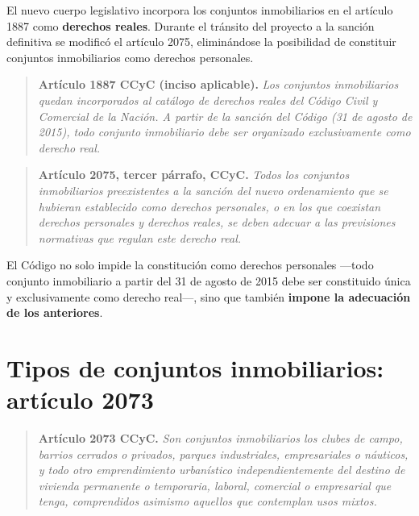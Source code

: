\documentclass[12pt,oneside]{book}
\begin{document}
El nuevo cuerpo legislativo incorpora los conjuntos inmobiliarios en el artículo 1887 como \textbf{derechos reales}. Durante el tránsito del proyecto a la sanción definitiva se modificó el artículo 2075, eliminándose la posibilidad de constituir conjuntos inmobiliarios como derechos personales.

\begin{quote}
\textbf{Artículo 1887 CCyC (inciso aplicable).} \textit{Los conjuntos inmobiliarios quedan incorporados al catálogo de derechos reales del Código Civil y Comercial de la Nación. A partir de la sanción del Código (31 de agosto de 2015), todo conjunto inmobiliario debe ser organizado exclusivamente como derecho real.}
\end{quote}

\begin{quote}
\textbf{Artículo 2075, tercer párrafo, CCyC.} \textit{Todos los conjuntos inmobiliarios preexistentes a la sanción del nuevo ordenamiento que se hubieran establecido como derechos personales, o en los que coexistan derechos personales y derechos reales, se deben adecuar a las previsiones normativas que regulan este derecho real.}
\end{quote}

\begin{important}
El Código no solo impide la constitución como derechos personales ---todo conjunto inmobiliario a partir del 31 de agosto de 2015 debe ser constituido única y exclusivamente como derecho real---, sino que también \textbf{impone la adecuación de los anteriores}.
\end{important}

\section{Tipos de conjuntos inmobiliarios: artículo 2073}

\begin{quote}
\textbf{Artículo 2073 CCyC.} \textit{Son conjuntos inmobiliarios los clubes de campo, barrios cerrados o privados, parques industriales, empresariales o náuticos, y todo otro emprendimiento urbanístico independientemente del destino de vivienda permanente o temporaria, laboral, comercial o empresarial que tenga, comprendidos asimismo aquellos que contemplan usos mixtos.}
\end{quote}
\end{document}
